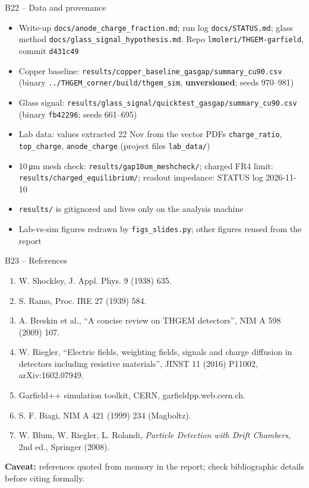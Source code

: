 \documentclass[aspectratio=169,11pt]{beamer}
\newcommand{\caveat}[1]{{\small\color{warn}\textbf{Caveat:} #1}}
\begin{document}
\begin{frame}[label=b-prov]{B22 -- Data and provenance}
  \small
  \begin{itemize}
    \item Write-up \texttt{docs/anode\_charge\_fraction.md}; run log \texttt{docs/STATUS.md}; glass method \texttt{docs/glass\_signal\_hypothesis.md}. Repo \texttt{lmoleri/THGEM-garfield}, commit \texttt{d431c49}
    \item Copper baseline: \texttt{results/copper\_baseline\_gasgap/summary\_cu90.csv} (binary \texttt{../THGEM\_corner/build/thgem\_sim}, \textbf{unversioned}; seeds 970--981)
    \item Glass signal: \texttt{results/glass\_signal/quicktest\_gasgap/summary\_cu90.csv} (binary \texttt{fb42296}; seeds 661--695)
    \item Lab data: values extracted 22 Nov from the vector PDFs \texttt{charge\_ratio}, \texttt{top\_charge}, \texttt{anode\_charge} (project files \texttt{lab\_data/})
    \item 10\,\si{\micro m} mesh check: \texttt{results/gap10um\_meshcheck/}; charged FR4 limit: \texttt{results/charged\_equilibrium/}; readout impedance: STATUS log 2026-11-10
    \item \texttt{results/} is gitignored and lives only on the analysis machine
    \item Lab-vs-sim figures redrawn by \texttt{figs\_slides.py}; other figures reused from the report
  \end{itemize}
\end{frame}

\begin{frame}[label=b-refs]{B23 -- References}
  \footnotesize
  \begin{enumerate}
    \item W. Shockley, J. Appl. Phys. 9 (1938) 635.
    \item S. Ramo, Proc. IRE 27 (1939) 584.
    \item A. Breskin et al., ``A concise review on THGEM detectors'', NIM A 598 (2009) 107.
    \item W. Riegler, ``Electric fields, weighting fields, signals and charge diffusion in detectors including resistive materials'', JINST 11 (2016) P11002, arXiv:1602.07949.
    \item Garfield++ simulation toolkit, CERN, garfieldpp.web.cern.ch.
    \item S. F. Biagi, NIM A 421 (1999) 234 (Magboltz).
    \item W. Blum, W. Riegler, L. Rolandi, \emph{Particle Detection with Drift Chambers}, 2nd ed., Springer (2008).
  \end{enumerate}
  \vspace{6pt}
  \caveat{references quoted from memory in the report; check bibliographic details before citing formally.}
\end{frame}
\end{document}
